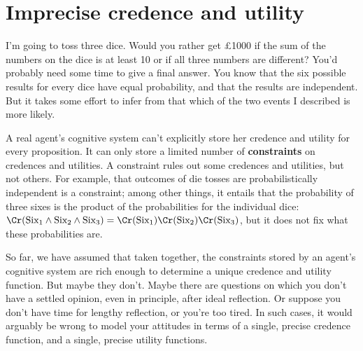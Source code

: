 
\section{Imprecise credence and utility}\label{sec:imprecise}

I'm going to toss three dice. Would you rather get £1000 if the sum of
the numbers on the dice is at least 10 or if all three numbers are
different? You'd probably need some time to give a final answer. You
know that the six possible results for every dice have equal
probability, and that the results are independent. But it takes some
effort to infer from that which of the two events I described is more
likely.

A real agent's cognitive system can't explicitly store her credence
and utility for every proposition. It can only store a limited number
of \textbf{constraints} on credences and utilities. A constraint rules
out some credences and utilities, but not others. For example, that
outcomes of die tosses are probabilistically independent is a
constraint; among other things, it entails that the probability of
three sixes is the product of the probabilities for the individual
dice:
$\Cr(\text{Six}_1 \land \text{Six}_2 \land \text{Six}_3) =
\Cr(\text{Six}_1)\Cr(\text{Six}_2)\Cr(\text{Six}_3)$, but it does not
fix what these probabilities are.

So far, we have assumed that taken together, the constraints stored by
an agent's cognitive system are rich enough to determine a unique
credence and utility function. But maybe they don't. Maybe there are
questions on which you don't have a settled opinion, even in
principle, after ideal reflection. Or suppose you don't have time for
lengthy reflection, or you're too tired. In such cases, it would
arguably be wrong to model your attitudes in terms of a single,
precise credence function, and a single, precise utility functions.

